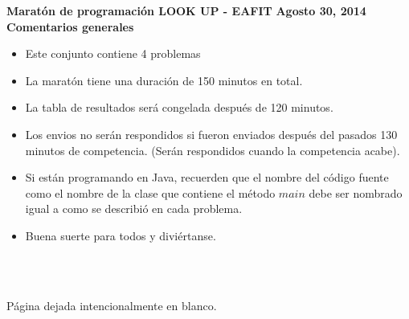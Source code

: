 \documentclass[12pt,letterpaper,oneside]{article}
\begin{document}
\thispagestyle{empty}
\begin{center}
	\LARGE\textbf{\center Maratón de programación LOOK UP - EAFIT}
	\LARGE\textbf{\center Agosto 30, 2014}
	\vspace*{\fill}
	\LARGE\textbf{\center Comentarios generales}
	\begin{itemize}
		\item Este conjunto contiene 4 problemas
		\item La maratón tiene una duración de 150 minutos en total.
               	\item La tabla de resultados será congelada después de 120 minutos.
                	\item Los envios no serán respondidos si fueron enviados después del pasados 130 minutos de competencia. (Serán respondidos cuando la competencia acabe).
		\item Si están programando en Java, recuerden que el nombre del código fuente como el nombre de la clase que contiene el método $main$ debe ser nombrado igual a como se describió en cada problema.
		\item Buena suerte para todos y diviértanse.
	\end{itemize}
	\quad \\ \quad \\
	\vspace*{\fill}
\end{center}
\newpage

\thispagestyle{empty}
\vspace*{\fill}
\begin{center}
	\LARGE{Página dejada intencionalmente en blanco.}
\end{center}
\vspace*{\fill}
\newpage





\end{document}
